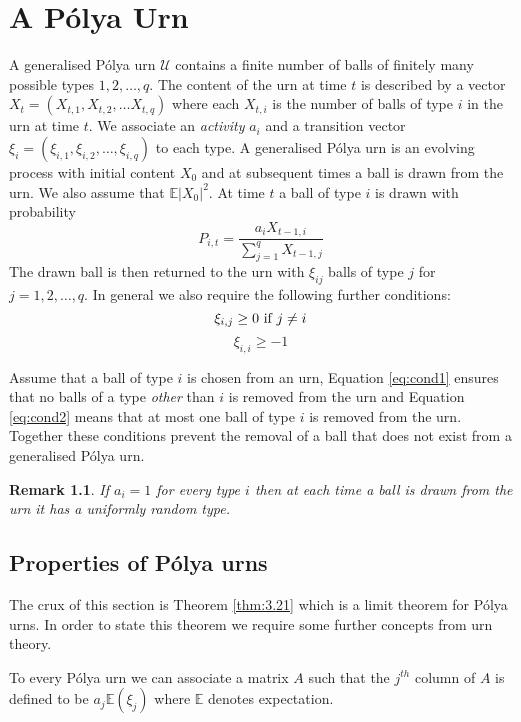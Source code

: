 \documentclass[oneside]{book} %
\newtheorem{remk}{Remark}
\theoremstyle{definition}
\numberwithin{equation}{section}
\begin{document}
\chapter{A P\'{o}lya Urn}\label{chap:polya}
A generalised P\'{o}lya urn $\mathcal{U}$ contains a finite number of balls of finitely many possible types $1,2,\dots,q$. The content of the urn at time $t$
is described by a vector $X_{t} = (X_{t,1},X_{t,2},\dots X_{t,q})$ where each $X_{t,i}$ is the number of balls of type $i$ in the urn at time $t$.  We associate an
\emph{activity} $a_{i}$ and a transition vector $\xi_{i} = (\xi_{i,1},\xi_{i,2},\dots,\xi_{i,q})$ to each type.  A generalised P\'{o}lya urn is an evolving process with initial
content $X_0$ and at subsequent times a ball is drawn from the urn. We also assume that $\mathbb{E} \lvert X_0 \rvert^2$.  At time $t$ a ball of type $i$ is drawn with probability
\[P_{i,t} = \frac{a_{i}X_{t-1,i}}{\sum_{j=1}^q X_{t-1,j}}\]  
The drawn ball is then  returned to the urn with $\xi_{ij}$ balls of type $j$ for $j = 1,2,\dots,q$.  In general we also require the following further conditions:
\begin{equation}\label{eq:cond1}
 \xi_{i,j} \geq 0 \text{   if   } j \neq i\\ 
\end{equation}
\begin{equation}\label{eq:cond2}
 \xi_{i,i} \geq -1 
\end{equation}

Assume that a ball of type $i$ is chosen from an urn, Equation \ref{eq:cond1} ensures that no balls of a type \emph{other} than $i$ is removed from the urn and Equation \ref{eq:cond2} means that at most one ball of type $i$  is removed from the urn.  Together these conditions prevent the removal of a ball that does not exist from a generalised P\'{o}lya urn.      

\begin{remk}
 If $a_i = 1$ for every type $i$ then at each time a ball is drawn from the urn it has a uniformly random type.   
\end{remk}

\section{Properties of P\'{o}lya urns}
The crux of this section is Theorem \ref{thm:3.21} which is a limit theorem for P\'{o}lya urns.  In order to state this theorem we require some further concepts from urn theory.

To every P\'{o}lya urn we can associate a matrix $A$ such that the $j^{th}$ column of $A$ is defined to be $a_j \mathbb{E}(\xi_{j})$ where $\mathbb{E}$ denotes expectation.
\end{document}
